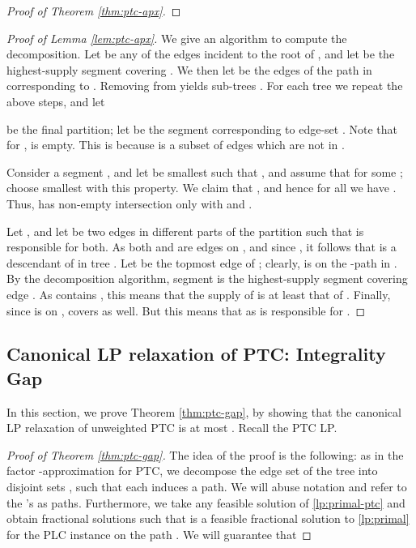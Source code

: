 \documentclass[11pt]{article}
\newcommand{\1}{\mathbb{1}}
\begin{document}
{\begin{proof}[Proof of Theorem \ref{thm:ptc-apx}]
\end{proof}

\begin{proof}[Proof of Lemma \ref{lem:ptc-apx}]
  We give an algorithm to compute the decomposition. Let  be 
  any of the edges incident to the root of , and let 
  be the highest-supply segment covering . We then let 
  be the edges of the path in  corresponding to . Removing
   from  yields sub-trees . For each
  tree  we repeat the above steps, and let 
  
  be the final partition; let  be the segment 
  corresponding to edge-set . Note that for ,
   is empty. This is because 
is a subset of edges which are not in .

  Consider a segment , and let  be 
  smallest such that , and
  assume that  for some
  ; choose  smallest with this property. We
  claim that , 
 and hence for all
   we have .
Thus,  has non-empty intersection only with 
 and .


  Let , and let  be
  two edges in different parts of the partition such that  is responsible for both. 
  As both  and  are edges on , and since 
  , it follows that  is a descendant of  in tree .
  Let  be the topmost edge of ; clearly,  is on the
  -path in . By the decomposition algorithm, segment  is
  the highest-supply
  segment covering edge . As  contains , this means 
  that the supply of  is at least that of . Finally, since  is 
  on ,  covers  as well. But this means that 
   as  is responsible for .
\end{proof}

\subsection{Canonical LP relaxation of PTC: Integrality Gap}

In this section, we prove Theorem \ref{thm:ptc-gap}, by showing that 
the canonical LP relaxation of unweighted PTC is at most . 
Recall the PTC LP.


\begin{proof}[Proof of Theorem \ref{thm:ptc-gap}]
  The idea of the proof is the following: as in the factor
  -approximation for PTC, we decompose the edge set of the tree
  into disjoint sets , such that each  induces a
  path.  We will abuse notation and refer to the 's as paths.
  Furthermore, we take any feasible solution  of
  \eqref{lp:primal-ptc} and obtain  fractional solutions
   such that  is 
  a feasible
  fractional solution to \eqref{lp:primal} for the PLC instance on the
  path . We will guarantee that
  

\end{proof}}
\end{document}
